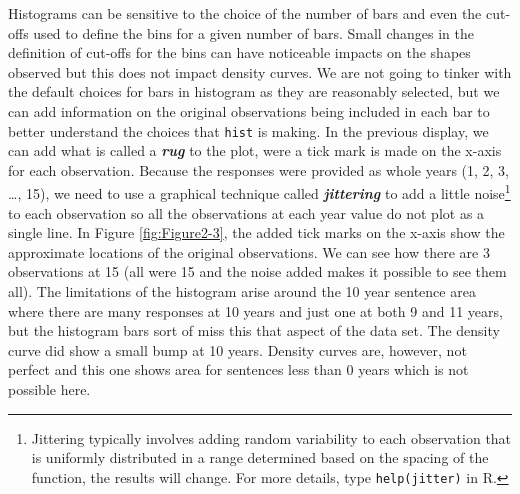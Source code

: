 \documentclass[]{book}
\newenvironment{Shaded}{\begin{snugshade}}{\end{snugshade}}
\newcommand{\KeywordTok}[1]{\textcolor[rgb]{0.13,0.29,0.53}{\textbf{#1}}}
\newcommand{\DataTypeTok}[1]{\textcolor[rgb]{0.13,0.29,0.53}{#1}}
\newcommand{\DecValTok}[1]{\textcolor[rgb]{0.00,0.00,0.81}{#1}}
\newcommand{\StringTok}[1]{\textcolor[rgb]{0.31,0.60,0.02}{#1}}
\newcommand{\OperatorTok}[1]{\textcolor[rgb]{0.81,0.36,0.00}{\textbf{#1}}}
\newcommand{\NormalTok}[1]{#1}
\let\rmarkdownfootnote\footnote%
\def\footnote{\protect\rmarkdownfootnote}
\theoremstyle{definition}
\theoremstyle{definition}
\theoremstyle{remark}
\begin{document}
Histograms can be sensitive to the choice of the number of bars and even
the cut-offs used to define the bins for a given number of bars. Small
changes in the definition of cut-offs for the bins can have noticeable
impacts on the shapes observed but this does not impact density curves.
We are not going to tinker with the default choices for bars in
histogram as they are reasonably selected, but we can add information on
the original observations being included in each bar to better
understand the choices that \texttt{hist} is making. In the previous
display, we can add what is called a \textbf{\emph{rug}} to the plot,
were a tick mark is made on the x-axis for each observation. Because the
responses were provided as whole years (1, 2, 3, \ldots{}, 15), we need
to use a graphical technique called \textbf{\emph{jittering}} to add a
little noise\footnote{Jittering typically involves adding random
  variability to each observation that is uniformly distributed in a
  range determined based on the spacing of the function, the results
  will change. For more details, type \texttt{help(jitter)} in R.} to
each observation so all the observations at each year value do not plot
as a single line. In Figure \ref{fig:Figure2-3}, the added tick marks on
the x-axis show the approximate locations of the original observations.
We can see how there are 3 observations at 15 (all were 15 and the noise
added makes it possible to see them all). The limitations of the
histogram arise around the 10 year sentence area where there are many
responses at 10 years and just one at both 9 and 11 years, but the
histogram bars sort of miss this that aspect of the data set. The
density curve did show a small bump at 10 years. Density curves are,
however, not perfect and this one shows area for sentences less than 0
years which is not possible here.




\begin{Shaded}
\end{Shaded}
\end{document}
